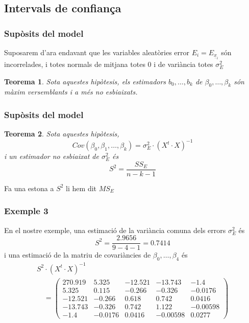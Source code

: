 \documentclass[12pt,t]{beamer}
\theoremstyle{plain}
\newtheorem{teorema}{Teorema}
\theoremstyle{definition}
\begin{document}
\subsection{Intervals de confiança}
\begin{frame}
\frametitle{Supòsits del model}

Suposarem d'ara endavant que les variables aleatòries error $E_i=E_{\underline{x}_{i}}$ són incorrelades, i totes normals de mitjana totes 0 i de variància totes $\sigma_E^2$
\medskip

\begin{teorema}
Sota aquestes hipòtesis, els estimadors $b_0,\ldots, b_k$ de
$\beta_0,\ldots,\beta_k$ són màxim versemblants i a més no esbiaixats.
\end{teorema}
\end{frame}

\begin{frame}
\frametitle{Supòsits del model}

\begin{teorema}
Sota aquestes hipòtesis, 
$$
Cov(\beta_0,\beta_1,\ldots,\beta_k)= \sigma_E^2\cdot (X^t\cdot X)^{-1}
$$
i un estimador no esbiaixat de $\sigma_E^2$ és
$$
S^2=\frac{SS_E}{n-k-1}
$$
\end{teorema}
Fa una estona a $S^2$ li hem dit $MS_E$

\end{frame}





\begin{frame}
\frametitle{Exemple 3}
En el nostre exemple, una estimació de la variància comuna dels errors $\sigma_E^2$ és
$$
S^2 = \frac{2.9656}{9-4-1}=0.7414
$$
i una estimació de la matriu de covariàncies de $\beta_0,\ldots, \beta_4$ és
{\footnotesize 
$$
\begin{array}{l}
S^2\cdot (X^t\cdot X)^{-1}\\[2ex]
\quad  =
\left(
\begin{array}{ccccc}
270.919 & 5.325 & -12.521 & -13.743 & -1.4 \\
5.325 & 0.115 & -0.266 & -0.326 & -0.0176 \\
-12.521 & -0.266 & 0.618 & 0.742 & 0.0416 \\
-13.743 & -0.326 & 0.742 & 1.122 & -0.00598 \\
-1.4 & -0.0176 & 0.0416 & -0.00598 & 0.0277
\end{array}
\right)
\end{array}
$$
}
\end{frame}
\end{document}
